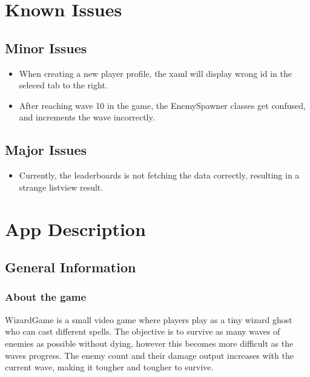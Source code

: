 \documentclass[12pt]{article}
\begin{document}
\section{Known Issues}

    \subsection{Minor Issues}

    \begin{itemize}
        \item When creating a new player profile, the xaml will display wrong id in the seleced tab to the right.
        \item After reaching wave 10 in the game, the EnemySpawner classes get confused, and increments the wave incorrectly.
    \end{itemize}

    \subsection{Major Issues}

    

    \begin{itemize}
        \item Currently, the leaderboards is not fetching the data correctly, resulting in a strange listview result.
    \end{itemize}

\section{App Description}

    \subsection{General Information}

        \subsubsection{About the game}

        WizardGame is a small video game where players play as a tiny wizard ghost who can cast different spells. The objective is to survive as many waves of enemies as possible without dying, however this becomes more difficult as the waves progress. The enemy count and their damage output increases with the current wave, making it tougher and tougher to survive. 
        
\end{document}

